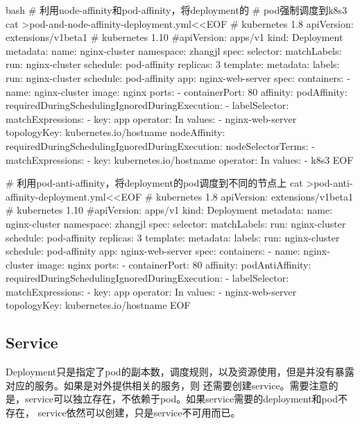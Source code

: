 \begin{code-block}{bash}
# 利用node-affinity和pod-affinity，将deployment的
# pod强制调度到k8s3
cat >pod-and-node-affinity-deployment.yml<<EOF
# kubernetes 1.8
apiVersion: extensions/v1beta1
# kubernetes 1.10
#apiVersion: apps/v1
kind: Deployment
metadata:
  name: nginx-cluster
  namespace: zhangjl
spec:
  selector:
    matchLabels:
      run: nginx-cluster
      schedule: pod-affinity
  replicas: 3
  template:
    metadata:
      labels:
        run: nginx-cluster
        schedule: pod-affinity
        app: nginx-web-server
    spec:
      containers:
      - name: nginx-cluster
        image: nginx
        ports:
        - containerPort: 80
      affinity:
        podAffinity:
          requiredDuringSchedulingIgnoredDuringExecution:
          - labelSelector:
              matchExpressions:
              - key: app
                operator: In
                values:
                - nginx-web-server
            topologyKey: kubernetes.io/hostname
        nodeAffinity:
          requiredDuringSchedulingIgnoredDuringExecution:
            nodeSelectorTerms:
            - matchExpressions:
              - key: kubernetes.io/hostname
                operator: In
                values:
                - k8s3
EOF

# 利用pod-anti-affinity，将deployment的pod调度到不同的节点上
cat >pod-anti-affinity-deployment.yml<<EOF
# kubernetes 1.8
apiVersion: extensions/v1beta1
# kubernetes 1.10
#apiVersion: apps/v1
kind: Deployment
metadata:
  name: nginx-cluster
  namespace: zhangjl
spec:
  selector:
    matchLabels:
      run: nginx-cluster
      schedule: pod-affinity
  replicas: 3
  template:
    metadata:
      labels:
        run: nginx-cluster
        schedule: pod-affinity
        app: nginx-web-server
    spec:
      containers:
      - name: nginx-cluster
        image: nginx
        ports:
        - containerPort: 80
      affinity:
        podAntiAffinity:
          requiredDuringSchedulingIgnoredDuringExecution:
          - labelSelector:
              matchExpressions:
              - key: app
                operator: In
                values:
                - nginx-web-server
            topologyKey: kubernetes.io/hostname
EOF
\end{code-block}

\subsection{Service}
Deployment只是指定了pod的副本数，调度规则，以及资源使用，但是并没有暴露对应的服务。如果是对外提供相关的服务，则
还需要创建service。需要注意的是，service可以独立存在，不依赖于pod。如果service需要的deployment和pod不存在，
service依然可以创建，只是service不可用而已。

